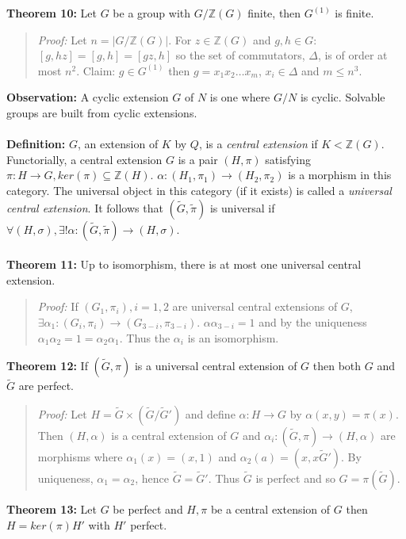 {\bf Theorem 10:} Let $G$ be a group with $G/{\mathbb Z}(G)$ finite, then $G^{(1)}$ is finite.
\begin{quote}
\emph{Proof:}
Let $n= |G/{\mathbb Z}(G)|$.  For $z \in {\mathbb Z}(G)$ and $g,h \in G$: $[g,hz]=[g,h]=[gz,h]$ so the 
set of commutators, $\Delta$, is of order at most $n^2$.
Claim: $g \in G^{(1)}$ then $g= x_1 x_2 \ldots x_m$, $x_i \in \Delta$ and
$m \le n^3$.
\end{quote}
{\bf Observation:}
A cyclic extension $G$ of $N$ is
one where $G/N$ is cyclic.  Solvable groups are built from cyclic extensions.
\\
\\
{\bf Definition:} 
$G$, an extension of $K$ by $Q$, is a \emph{central extension} if $K<{\mathbb Z}(G)$.  Functorially,
a central extension $G$ is a pair $(H, \pi)$ satisfying
$\pi: H \rightarrow G, ker(\pi) \subseteq {\mathbb Z}(H)$.  
$\alpha: (H_1 , \pi_1) \rightarrow (H_2, \pi_2)$ is a morphism in this category. 
The universal object in this category (if it exists) is called a 
\emph{universal central extension}.
It follows that $(\tilde{G}, \tilde{\pi})$ is universal if 
$\forall (H, \sigma), \exists ! \alpha : (\tilde{G}, \tilde{\pi}) \rightarrow
(H, \sigma)$.
\\
\\
{\bf Theorem 11:} Up to isomorphism, there is at most one universal central extension.
\begin{quote}
\emph{Proof:} 
If $(G_1, \pi_i), i= 1, 2$ are universal central extensions of $G$, 
$\exists \alpha_1:(G_i, \pi_i) \rightarrow (G_{3-i}, \pi_{3-i})$.
$\alpha \alpha_{3-i} = 1$ and by the uniqueness $\alpha_1 \alpha_2 = 1 = \alpha_2 \alpha_1$.
Thus the $\alpha_i$ is an isomorphism.
\end{quote}
{\bf Theorem 12:}   If $(\tilde{G}, \pi)$ is a universal central extension of $G$ then
both $G$ and $\tilde{G}$ are perfect.
\begin{quote}
\emph{Proof:} 
Let $H = \tilde{G} \times (\tilde{G}/\tilde{G}')$ and define $\alpha: H \rightarrow G$ by
$\alpha(x,y)= \pi(x)$.   Then $(H, \alpha)$ is a central extension of $G$ and
$\alpha_i: (\tilde{G}, \pi) \rightarrow (H, \alpha)$ are morphisms
where $\alpha_1(x)= (x,1)$ and $\alpha_2(a)= (x, x \tilde{G}')$.  By uniqueness,
$\alpha_1= \alpha_2$, hence $\tilde{G} = \tilde{G}'$.  Thus $\tilde{G}$ is perfect and so
$G= \pi(\tilde{G})$.
\end{quote}
{\bf Theorem 13:}  Let $G$ be perfect and $H, \pi$ be a central extension of $G$ then
$H=ker(\pi)H'$ with $H'$ perfect.
